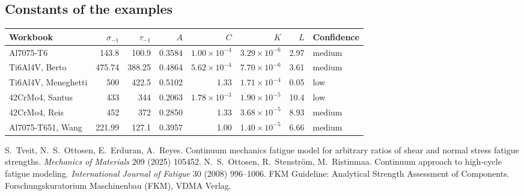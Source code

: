 \documentclass[11pt,a4paper]{article}
\newcommand{\sigm}{\sigma_{-1}}
\newcommand{\taum}{\tau_{-1}}
\begin{document}
\subsection*{Constants of the examples}
\begin{center}
\small
\begin{tabular}{@{}l r r r r r r l@{}}
\toprule
Workbook & $\sigm$ & $\taum$ & $A$ & $C$ & $K$ & $L$ & Confidence \\
\midrule
Al7075-T6 & 143.8 & 100.9 & 0.3584 & $1.00\times10^{-4}$ & $3.29\times10^{-6}$ & 2.97 & medium \\
Ti6Al4V, Berto & 475.74 & 388.25 & 0.4864 & $5.62\times10^{-4}$ & $7.70\times10^{-6}$ & 3.61 & medium \\
Ti6Al4V, Meneghetti & 500 & 422.5 & 0.5102 & 1.33 & $1.71\times10^{-4}$ & 0.05 & low \\
42CrMo4, Santus & 433 & 344 & 0.2063 & $1.78\times10^{-3}$ & $1.90\times10^{-5}$ & 10.4 & low \\
42CrMo4, Reis & 452 & 372 & 0.2850 & 1.33 & $3.68\times10^{-5}$ & 8.93 & medium \\
Al7075-T651, Wang & 221.99 & 127.1 & 0.3957 & 1.00 & $1.40\times10^{-5}$ & 6.66 & medium \\
\bottomrule
\end{tabular}
\end{center}

\begin{thebibliography}{9}
 S.~Tveit, N.~S.~Ottosen, E.~Erduran, A.~Reyes. Continuum mechanics fatigue model for arbitrary
  ratios of shear and normal stress fatigue strengths. \emph{Mechanics of Materials} 209 (2025) 105452.
 N.~S.~Ottosen, R.~Stenstr\"om, M.~Ristinmaa. Continuum approach to high-cycle fatigue
  modeling. \emph{International Journal of Fatigue} 30 (2008) 996--1006.
 FKM Guideline: Analytical Strength Assessment of Components. Forschungskuratorium Maschinenbau (FKM),
  VDMA Verlag.
\end{thebibliography}
\end{document}
